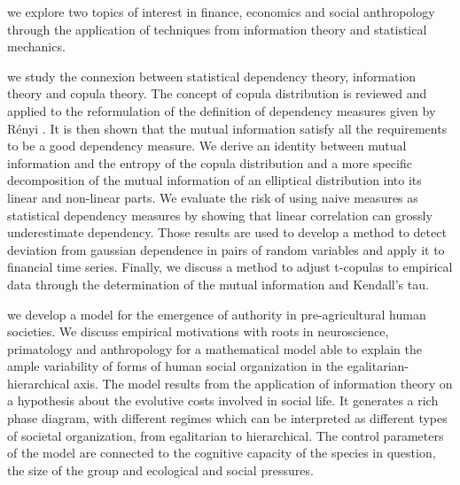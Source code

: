  we explore two topics of interest in finance, economics and social anthropology through the application of techniques from information theory and statistical mechanics. 

 we study the connexion between statistical dependency theory, information theory and copula theory. The concept of copula distribution is reviewed and applied to the reformulation of the definition of dependency measures given by Rényi \cite{Renyi1959}. It is then shown that the mutual information satisfy all the requirements to be a good dependency measure. We derive an identity between mutual information and the entropy of the copula distribution and a more specific decomposition of the mutual information of an elliptical distribution into its linear and non-linear parts. We evaluate the risk of using naive measures as statistical dependency measures by showing that linear correlation can grossly underestimate dependency. Those results are used to develop a method to detect deviation from gaussian dependence in pairs of random variables and apply it to financial time series. Finally, we discuss a method to adjust t-copulas to empirical data\cite{Calsaverini2009} through the determination of the mutual information and Kendall's tau.

 we develop a model for the emergence of authority in pre-agricultural human societies. We discuss empirical motivations with roots in neuroscience, primatology and anthropology for a mathematical model able to explain the ample variability of forms of human social organization in the egalitarian-hierarchical axis. The model results from the application of information theory on a hypothesis about the evolutive costs involved in social life. It generates a rich phase diagram, with different regimes which can be interpreted as different types of societal organization, from egalitarian to hierarchical. The control parameters of the model are connected to the cognitive capacity of the species in question, the size of the group and ecological and social pressures.